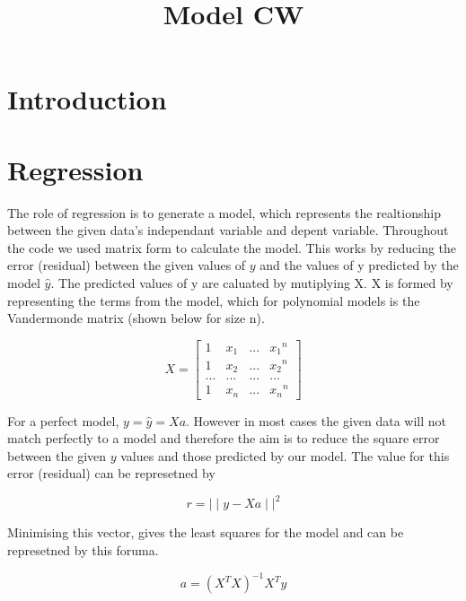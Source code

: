 \documentclass[]{article}
\title{Model CW}
\begin{document}
\maketitle

\section{Introduction}

\section{Regression}

The role of regression is to generate a model, which represents the realtionship
between the given data's independant variable and depent variable. Throughout
the code we used matrix form to calculate the model. This works by reducing the
error (residual) between the given values of $y$ and the values of y predicted by the model
$\hat{y}$. The predicted values of y are caluated by mutiplying X. X is formed
by representing the terms from the model, which for polynomial models is the
Vandermonde matrix (shown below for size n).

\begin{equation}
  X = 
  \begin{bmatrix}
    1   & x_1   & ... & {x_1}^n     \\
    1   & {x_2} & ... & {x_2}^n  \\
    ... & ...   & ... & ...     \\
    1   & {x_n} & ... & {x_n}^n  
  \end{bmatrix}
\end{equation}

For a perfect model, $y = \hat{y} = Xa$. However in most cases the given data
will not match perfectly to a model and therefore the aim is to reduce
the square error between the given $y$ values and those predicted by our model.
The value for this error (residual) can be represetned by

\begin{equation}
  r = {\mid \mid y - Xa \mid \mid}^2
\end{equation}

Minimising this vector, gives the least squares for the model and can be
represetned by this foruma.

\begin{equation}
  a = (X^T X)^{-1}X^Ty
\end{equation}
\end{document}
